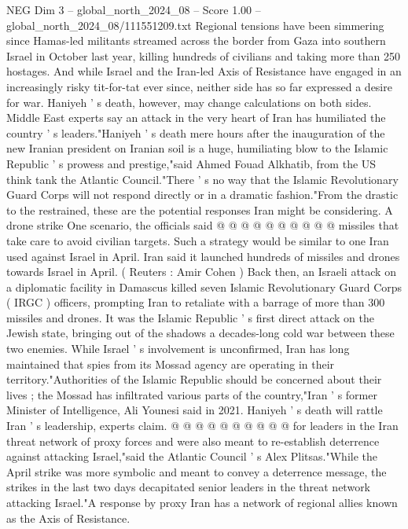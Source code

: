\begin{textsample}{NEG Dim 3 – global\_north\_2024\_08 – Score 1.00 – global\_north\_2024\_08/111551209.txt}  \label{ex:f3_neg_313}
Regional tensions have been simmering since Hamas-led militants streamed across the border from Gaza into southern Israel in October last year, killing hundreds of civilians and taking more than 250 hostages.
And while Israel and the Iran-led Axis of Resistance have engaged in an increasingly risky tit-for-tat ever since, neither side has so far expressed a desire for war.
Haniyeh ' s death, however, may change calculations on both sides.
Middle East experts say an attack in the very heart of Iran has humiliated the country ' s leaders."Haniyeh ' s death mere hours after the inauguration of the new Iranian president on Iranian soil is a huge, humiliating blow to the Islamic Republic ' s prowess and prestige,"said Ahmed Fouad Alkhatib, from the US think tank the Atlantic Council."There ' s no way that the Islamic Revolutionary Guard Corps will not respond directly or in a dramatic fashion."From the drastic to the restrained, these are the potential responses Iran might be considering.
A drone strike One scenario, the officials said @ @ @ @ @ @ @ @ @ @ missiles that take care to avoid civilian targets.
Such a strategy would be similar to one Iran used against Israel in April.
Iran said it launched hundreds of missiles and drones towards Israel in April. ( Reuters : Amir Cohen ) Back then, an Israeli attack on a diplomatic facility in Damascus killed seven Islamic Revolutionary Guard Corps ( IRGC ) officers, prompting Iran to retaliate with a barrage of more than 300 missiles and drones.
It was the Islamic Republic ' s first direct attack on the Jewish state, bringing out of the shadows a decades-long cold war between these two enemies.
While Israel ' s involvement is unconfirmed, Iran has long maintained that spies from its Mossad agency are operating in their territory."Authorities of the Islamic Republic should be concerned about their lives ; the Mossad has infiltrated various parts of the country,"Iran ' s former Minister of Intelligence, Ali Younesi said in 2021.
Haniyeh ' s death will rattle Iran ' s leadership, experts claim. @ @ @ @ @ @ @ @ @ @ for leaders in the Iran threat network of proxy forces and were also meant to re-establish deterrence against attacking Israel,"said the Atlantic Council ' s Alex Plitsas."While the April strike was more symbolic and meant to convey a deterrence message, the strikes in the last two days decapitated senior leaders in the threat network attacking Israel."A response by proxy Iran has a network of regional allies known as the Axis of Resistance.

\end{textsample}
